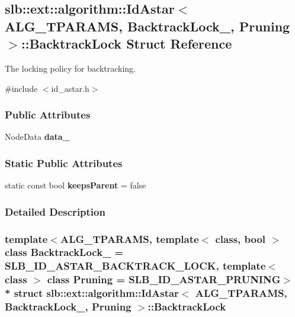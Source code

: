 \hypertarget{structslb_1_1ext_1_1algorithm_1_1IdAstar_1_1BacktrackLock}{}\subsection{slb\+:\+:ext\+:\+:algorithm\+:\+:Id\+Astar$<$ A\+L\+G\+\_\+\+T\+P\+A\+R\+A\+MS, Backtrack\+Lock\+\_\+, Pruning $>$\+:\+:Backtrack\+Lock Struct Reference}
\label{structslb_1_1ext_1_1algorithm_1_1IdAstar_1_1BacktrackLock}


The locking policy for backtracking.  




{\ttfamily \#include $<$id\+\_\+astar.\+h$>$}

\subsubsection*{Public Attributes}
\begin{DoxyCompactItemize}
\item 
Node\+Data {\bfseries data\+\_\+}\hypertarget{structslb_1_1ext_1_1algorithm_1_1IdAstar_1_1BacktrackLock_a941032b87afa4b52abf663a8e5d9c331}{}\label{structslb_1_1ext_1_1algorithm_1_1IdAstar_1_1BacktrackLock_a941032b87afa4b52abf663a8e5d9c331}

\end{DoxyCompactItemize}
\subsubsection*{Static Public Attributes}
\begin{DoxyCompactItemize}
\item 
static const bool {\bfseries keeps\+Parent} = false\hypertarget{structslb_1_1ext_1_1algorithm_1_1IdAstar_1_1BacktrackLock_a208d2ccab54b43fa7066378818a792a9}{}\label{structslb_1_1ext_1_1algorithm_1_1IdAstar_1_1BacktrackLock_a208d2ccab54b43fa7066378818a792a9}

\end{DoxyCompactItemize}


\subsubsection{Detailed Description}
\subsubsection*{template$<$A\+L\+G\+\_\+\+T\+P\+A\+R\+A\+MS, template$<$ class, bool $>$ class Backtrack\+Lock\+\_\+ = S\+L\+B\+\_\+\+I\+D\+\_\+\+A\+S\+T\+A\+R\+\_\+\+B\+A\+C\+K\+T\+R\+A\+C\+K\+\_\+\+L\+O\+CK, template$<$ class $>$ class Pruning = S\+L\+B\+\_\+\+I\+D\+\_\+\+A\+S\+T\+A\+R\+\_\+\+P\+R\+U\+N\+I\+NG$>$\\*
struct slb\+::ext\+::algorithm\+::\+Id\+Astar$<$ A\+L\+G\+\_\+\+T\+P\+A\+R\+A\+M\+S, Backtrack\+Lock\+\_\+, Pruning $>$\+::\+Backtrack\+Lock}

